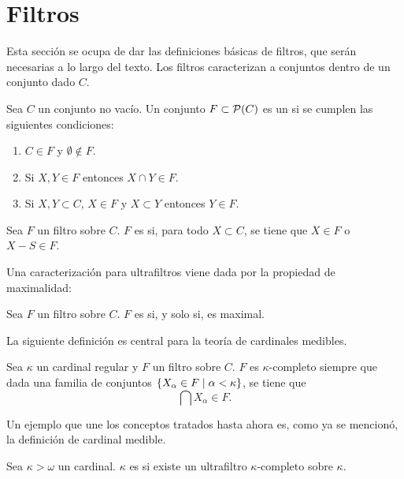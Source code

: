 \section{Filtros}

Esta sección se ocupa de dar las definiciones básicas de filtros,
que serán necesarias a lo largo del texto.
Los filtros caracterizan a conjuntos  dentro
de un conjunto dado $C$.

\begin{defi}
    Sea $C$ un conjunto no vacío. Un conjunto $F\subset \mathcal{P}(C)$ es un
     si se cumplen las siguientes condiciones:
    \begin{enumerate}[label=\alph*)]
        \item $C\in F$ y $\emptyset\notin F$.
        \item Si $X,Y\in F$ entonces $X\cap Y\in F$.
        \item Si $X,Y\subset C$, $X\in F$ y $X\subset Y$ entonces $Y\in F$.
    \end{enumerate}
\end{defi}

\begin{defi}
    Sea $F$ un filtro sobre $C$. $F$ es  si, para todo $X\subset C$,
    se tiene que $X\in F$ o $X-S\in F$.
\end{defi}

Una caracterización para ultrafiltros viene dada por la propiedad
de maximalidad:

\begin{teo}
    Sea $F$ un filtro sobre $C$. $F$ es  si, y solo si, es maximal.
\end{teo}

La siguiente definición es central para la teoría de cardinales medibles.

\begin{defi}
    Sea $\kappa$ un cardinal regular y $F$ un filtro sobre $C$.
    $F$ es $\kappa$-completo siempre que dada una familia de conjuntos
    $\left\{ X_\alpha\in F\mid \alpha<\kappa \right\}$,
    se tiene que
    \[
        \bigcap X_\alpha \in F.
    \]
\end{defi}

Un ejemplo que une los conceptos tratados hasta ahora es, como ya se mencionó,
la definición de cardinal medible.

\begin{defi}
    Sea $\kappa > \omega$ un cardinal. $\kappa$ es  si existe
    un ultrafiltro $\kappa\text{-completo}$ sobre $\kappa$.
\end{defi}

